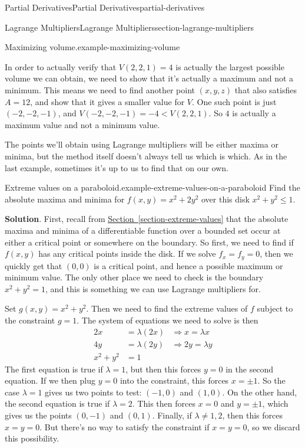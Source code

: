 \documentclass[oneside,10pt,]{book}
\numberwithin{equation}{section}
\begin{document}
\begin{chapterptx}{Partial Derivatives}{}{Partial Derivatives}{}{}{partial-derivatives}
\begin{sectionptx}{Lagrange Multipliers}{}{Lagrange Multipliers}{}{}{section-lagrange-multipliers}
\begin{example}{Maximizing volume.}{example-maximizing-volume}
\par
\hypertarget{p-1450}{}%
In order to actually verify that \(V(2,2,1) = 4\) is actually the largest possible volume we can obtain, we need to show that it's actually a maximum and not a minimum. This means we need to find another point \((x,y,z)\) that also satisfies \(A = 12\), and show that it gives a smaller value for \(V\). One such point is just \((-2,-2,-1)\), and \(V(-2,-2,-1) = -4 < V(2,2,1)\). So \(4\) is actually a maximum value and not a minimum value.%
\end{example}
\hypertarget{p-1451}{}%
The points we'll obtain using Lagrange multipliers will be either maxima or minima, but the method itself doesn't always tell us which is which. As in the last example, sometimes it's up to us to find that on our own.%
\begin{example}{Extreme values on a paraboloid.}{example-extreme-values-on-a-paraboloid}%
\hypertarget{p-1452}{}%
Find the absolute maxima and minima for \(f(x,y) = x^{2} + 2y^{2}\) over this disk \(x^{2} + y^{2} \leq 1\).%
\par\smallskip%
\noindent\textbf{Solution}.\hypertarget{solution-236}{}\quad%
\hypertarget{p-1453}{}%
First, recall from \hyperref[section-extreme-values]{Section~\ref{section-extreme-values}} that the absolute maxima and minima of a differentiable function over a bounded set occur at either a critical point or somewhere on the boundary. So first, we need to find if \(f(x,y)\) has any critical points inside the disk. If we solve \(f_{x} = f_{y} = 0\), then we quickly get that \((0,0)\) is a critical point, and hence a possible maximum or minimum value. The only other place we need to check is the boundary \(x^{2} + y^{2} = 1\), and this is something we can use Lagrange multipliers for.%
\par
\hypertarget{p-1454}{}%
Set \(g(x,y) = x^{2} + y^{2}\). Then we need to find the extreme values of \(f\) subject to the constraint \(g = 1\). The system of equations we need to solve is then%
\begin{align*}
2x & = \lambda(2x) & \Rightarrow x = \lambda x \\
4y & = \lambda(2y) & \Rightarrow 2y = \lambda y\\
x^{2} + y^{2} & = 1 
\end{align*}
The first equation is true if \(\lambda = 1\), but then this forces \(y = 0\) in the second equation. If we then plug \(y = 0\) into the constraint, this forces \(x = \pm1\). So the case \(\lambda=1\) gives us two points to test: \((-1,0)\) and \((1,0)\). On the other hand, the second equation is true if \(\lambda = 2\). This then forces \(x = 0\) and \(y = \pm 1\), which gives us the points \((0,-1)\) and \((0,1)\). Finally, if \(\lambda\neq1,2\), then this forces \(x = y = 0\). But there's no way to satisfy the constraint if \(x = y = 0\), so we discard this possibility.%

\end{example}
\end{sectionptx}
\end{chapterptx}
\end{document}
